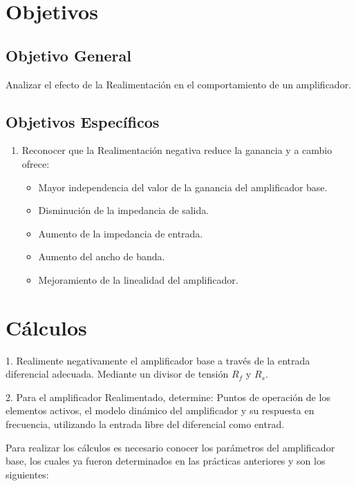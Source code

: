 \documentclass{article}
\begin{document}


\section{Objetivos}

\subsection{Objetivo General}

Analizar el efecto de la Realimentación en el comportamiento de un amplificador.

\subsection{Objetivos Específicos}

\begin{enumerate}
    \item Reconocer que la Realimentación negativa reduce la ganancia y a cambio ofrece:
    \begin{itemize}
        \item Mayor independencia del valor de la ganancia del amplificador base.
        \item Disminución de la impedancia de salida.
        \item Aumento de la impedancia de entrada.
        \item Aumento del ancho de banda.
        \item Mejoramiento de la linealidad del amplificador.
    \end{itemize}
    
\end{enumerate}

\section{Cálculos}

1. Realimente negativamente el amplificador base a través de la entrada diferencial adecuada. Mediante un divisor de tensión $R_f$ y $R_s$.

2. Para el amplificador Realimentado, determine: Puntos de operación de los elementos activos, el modelo dinámico del amplificador y su respuesta en frecuencia, utilizando la entrada libre del diferencial como entrad.


Para realizar los cálculos es necesario conocer los parámetros del amplificador base, los cuales ya fueron determinados en las prácticas anteriores y son los siguientes:
\end{document}
